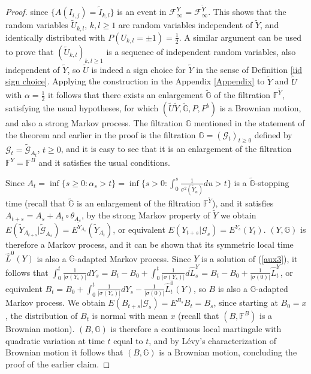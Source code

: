 \documentclass[reqno]{amsart}
\theoremstyle{definition}
\theoremstyle{remark}
\numberwithin{equation}{section}
\begin{document}
\begin{proof}
since $\{A(I_{i,j})=\widetilde{I}_{k,l}\}$ is an event in $\mathcal{F}^Y_{\infty}= \mathcal{F}^{\widetilde{Y}}_{\infty}$. This shows that the random variables $\widetilde{U}_{k,l}$, $k,l\ge 1$ are random variables independent of $\widetilde{Y}$, and identically distributed with $P(U_{k,l}=\pm1)=\frac12$. A similar argument can be used to prove that $(\widetilde{U}_{k,l})_{k,l\ge 1}$ is a sequence of independent random variables, also independent of $\widetilde{Y}$, so $\widetilde{U}$ is indeed a sign choice for $\widetilde{Y}$ in the sense of Definition \ref{iid sign choice}. Applying the construction in the Appendix \ref{Appendix} to $\widetilde{Y}$ and $\widetilde{U}$ with $\alpha=\frac12$ it follows that there exists an enlargement $\widetilde{\mathbb{G}}$ of the filtration $\mathbb{F}^{\widetilde{Y}}$, satisfying the usual hypotheses, for which $(\widetilde{U}\widetilde{Y},\widetilde{\mathbb{G}},P,P^b)$ is a Brownian motion, and also a strong Markov process. The filtration $\mathbb{G}$ mentioned in the statement of the theorem and earlier in the proof is the filtration $\mathbb{G}=(\mathcal{G}_t)_{t\ge 0}$ defined by $\mathcal{G}_t=\widetilde{\mathcal{G}}_{A_t}$, $t\ge 0$, and it is easy to see that it is an  enlargement of the filtration $\mathbb{F}^Y=\mathbb{F}^B$ and it satisfies the usual conditions.

Since $A_t=\inf\{s\ge0:\alpha_s>t\}=\inf\{s>0: \int_0^s \frac{1}{\sigma^2(\widetilde{Y}_u)}du>t\}$ is a $\widetilde{\mathbb{G}}$-stopping time (recall that $\widetilde{\mathbb{G}}$ is an enlargement of the filtration  $\mathbb{F}^{\widetilde{Y}}$), and it satisfies $A_{t+s}=A_s+A_{t}\circ \theta_{A_s}$, by the strong Markov property of $\widetilde{Y}$ we obtain $E\left(\widetilde{Y}_{A_{t+s}}\vert \widetilde{\mathcal{G}}_{A_s}\right)=E^{\widetilde{Y}_{A_s}}\left( \widetilde{Y}_{A_t}\right)$, or equivalent $E\left(Y_{t+s}\vert {\mathcal{G}}_{s}\right)=E^{{Y}_{s}}\left( {Y}_{t}\right)$. $(Y,\mathbb{G})$ is therefore a Markov process, and it can be shown that its symmetric local time $\widehat{L}^0(Y)$ is also a $\mathbb{G}$-adapted Markov process. Since $Y$ is a solution of (\ref{aux3}), it follows that $\int_0^t\frac{1}{\vert\sigma(Y_s)\vert} dY_s=B_t-B_0+\int_0^t\frac{1}{\vert\sigma(Y_s)\vert} d\widehat{L}^Y_s=B_t-B_0+\frac{1}{\vert\sigma(0)\vert} \widehat{L}^Y_t$, or equivalent $B_t=B_0+\int_0^t\frac{1}{\vert\sigma(Y_s)\vert} dY_s-\frac{1}{\vert\sigma(0)\vert} \widehat{L}^0_t (Y)$, so $B$ is also a $\mathbb{G}$-adapted Markov process. We obtain $E(B_{t+s}\vert \mathcal{G}_s)=E^{B_s} B_t=B_s$, since starting at $B_0=x$, the distribution of $B_t$ is normal with mean $x$ (recall that $(B,\mathbb{F}^B)$ is a Brownian motion). $(B,\mathbb{G})$ is therefore a continuous local martingale with quadratic variation at time $t$ equal to $t$, and by L\'{e}vy's characterization of Brownian motion it follows that $(B,\mathbb{G})$ is a Brownian motion, concluding the proof of the earlier claim.


\end{proof}
\end{document}

